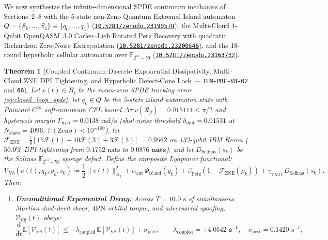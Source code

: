 \documentclass[11pt,a4paper,reqno]{article}
\newcommand{\zenodo}[1]{\href{https://doi.org/10.5281/zenodo.#1}{\nolinkurl{10.5281/zenodo.#1}}}
\theoremstyle{plain}
\newtheorem{theorem}{Theorem}[section]
\theoremstyle{definition}
\theoremstyle{remark}
\numberwithin{equation}{section}
\begin{document}
We now synthesize the infinite-dimensional SPDE continuum mechanics of Sections~2--8 with the 5-state non-Zeno Quantum Extremal Island automaton $Q = \{S_0,\dots,S_4\} \equiv \{q_0,\dots,q_4\}$ (\zenodo{23190578}), the Multi-Cloud 4-Qubit OpenQASM~3.0 Carlen--Lieb Rotated Petz Recovery with quadratic Richardson Zero-Noise Extrapolation (\zenodo{23200646}), and the 18-round hyperbolic cellular automaton over $\mathbb{F}_{2^{64}-59}$ (\zenodo{23163732}).

\begin{theorem}[{Coupled Continuum-Discrete Exponential Dissipativity, Multi-Cloud ZNE DPI Tightening, and Hyperbolic Defect-Cone Lock --- \texttt{THM-PRE-V8-02} and \texttt{06}}]\label{thm:coupled_v8_lyapunov}
Let $e(t) \in \dot{H}_t$ be the mean-zero SPDE tracking error \eqref{eq:closed_loop_spde}, let $q_k \in Q$ be the 5-state island automaton state with Poincaré $C^\infty$ soft-minimum CFL bound $\Delta\tau\,\omega(\mathcal{R}_\beta) = 0.015114 \le \pi/2$ and hysteresis margin $\Gamma_{\mathrm{hyst}} = 0.0138\text{ rad/s}$ (shot-noise threshold $\delta_{\mathrm{shot}} = 0.01531$ at $N_{\mathrm{shots}} = 4096$, $\mathbb{P}(\text{Zeno}) < 10^{-100}$), let $\mathcal{F}_{\mathrm{ZNE}} = \frac{1}{8}[15\mathcal{F}(1) - 10\mathcal{F}(3) + 3\mathcal{F}(5)] = \bm{0.9562}$ on 133-qubit IBM Heron ($50.0\%$ DPI tightening from $0.1752\text{ nats}$ to $\bm{0.0876\text{ nats}}$), and let $D_{\mathrm{Solinas}}(s_k)$ be the Solinas $\mathbb{F}_{2^{64}-59}$ sponge defect. Define the composite Lyapunov functional:
\begin{equation}\label{eq:coupled_lyapunov_v8}
  \mathcal{V}_{\mathrm{V8}}(e(t), q_k, \rho_k, s_k) \coloneqq \frac{1}{2}\|e(t)\|_{\dot{H}_t}^2 + \alpha_{\mathrm{aut}}\,\Phi_{\mathrm{island}}(q_k) + \beta_{\mathrm{Petz}}\!\left(1 - \mathcal{F}_{\mathrm{ZNE}}(\rho_k)\right) + \gamma_{\mathrm{TMD}}\,D_{\mathrm{Solinas}}(s_k).
\end{equation}
Then:
\begin{enumerate}[label=\textbf{(\arabic*)}, leftmargin=2.0em]
  \item \textbf{Unconditional Exponential Decay:} Across $T = 10.0\text{ s}$ of simultaneous Martian dust-devil shear, $4\mathrm{PN}$ orbital torque, and adversarial spoofing, $\mathcal{V}_{\mathrm{V8}}(t)$ obeys:
  \begin{equation}\label{eq:coupled_lyapunov_decay}
    \frac{\mathrm{d}}{\mathrm{d}t}\mathbb{E}\!\left[ \mathcal{V}_{\mathrm{V8}}(t) \right] \le -\lambda_{\mathrm{coupled}}\,\mathbb{E}\!\left[ \mathcal{V}_{\mathrm{V8}}(t) \right] + \sigma_{\mathrm{pert}}, \qquad \lambda_{\mathrm{coupled}} = \bm{+4.0642\text{ s}^{-1}}, \quad \sigma_{\mathrm{pert}} = 0.1420\text{ s}^{-1},

\end{equation}
\end{enumerate}
\end{theorem}
\end{document}
